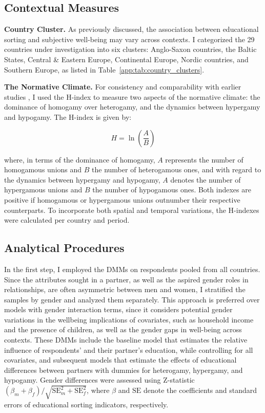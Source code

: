 \subsection{Contextual Measures}

\textbf{Country Cluster.} As previously discussed, the association between educational sorting and subjective well-being may vary across contexts. I categorized the 29 countries under investigation into six clusters: Anglo-Saxon countries, the Baltic States, Central \& Eastern Europe, Continental Europe, Nordic countries, and Southern Europe, as listed in Table~\ref{app:tab:country_clusters}.

\textbf{The Normative Climate.} For consistency and comparability with earlier studies \parencite{eratEducationalAssortativeMating2021,esteveGenderGapReversalEducation2012}, I used the H-index to measure two aspects of the normative climate: the dominance of homogamy over heterogamy, and the dynamics between hypergamy and hypogamy. The H-index is given by:

\begin{equation}
    \label{eq:h-index}
    H = \ln\left(\frac{A}{B}\right)
\end{equation}

where, in terms of the dominance of homogamy, $A$ represents the number of homogamous unions and $B$ the number of heterogamous ones, and with regard to the dynamics between hypergamy and hypogamy, $A$ denotes the number of hypergamous unions and $B$ the number of hypogamous ones. Both indexes are positive if homogamous or hypergamous unions outnumber their respective counterparts. To incorporate both spatial and temporal variations, the H-indexes were calculated per country and period.

\subsection{Analytical Procedures}

In the first step, I employed the DMMs on respondents pooled from all countries. Since the attributes sought in a partner, as well as the aspired gender roles in relationships, are often asymmetric between men and women, I stratified the samples by gender and analyzed them separately. This approach is preferred over models with gender interaction terms, since it considers potential gender variations in the wellbeing implications of covariates, such as household income and the presence of children, as well as the gender gaps in well-being across contexts. These DMMs include the baseline model that estimates the relative influence of respondents' and their partner's education, while controlling for all covariates, and subsequent models that estimate the effects of educational differences between partners with dummies for heterogamy, hypergamy, and hypogamy. Gender differences were assessed using Z-statistic $(\beta_{m} + \beta_{f})/\sqrt{\text{SE}_{m}^{2} + \text{SE}_{f}^{2}}$, where $\beta$ and $\text{SE}$ denote the coefficients and standard errors of educational sorting indicators, respectively.


